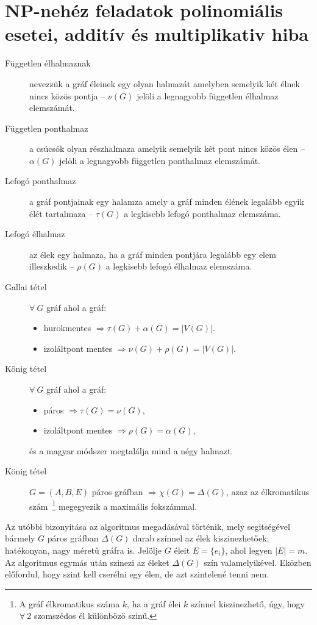\section{NP-nehéz feladatok polinomiális esetei, additív és multiplikativ hiba}

\begin{description}
  \item[Független élhalmaznak] nevezzük a gráf éleinek egy olyan halmazát
  amelyben semelyik két élnek nincs közös pontja -- $\nu(G)$ jelöli a legnagyobb
  független élhalmaz elemszámát.
  \item[Független ponthalmaz]  a csúcsók olyan részhalmaza amelyik semelyik két
  pont nincs közös élen -- $\alpha(G)$ jelöli a legnagyobb független ponthalmaz
  elemszámát.
  \item[Lefogó ponthalmaz] a gráf pontjainak egy halamza amely a gráf minden
  élének legalább egyik élét tartalmaza -- $\tau(G)$ a legkisebb lefogó
  ponthalmaz elemszáma.
  \item[Lefogó élhalmaz] az élek egy halmaza, ha a gráf minden pontjára legalább
  egy elem illeszkedik -- $\rho(G)$ a legkisebb lefogó élhalmaz elemszáma.
  \item[Gallai tétel] $\forall~G$ gráf ahol a gráf: \begin{itemize}
  		\item hurokmentes $\Rightarrow \tau(G)+\alpha(G) = |V(G)|$. 
  		\item izoláltpont mentes $\Rightarrow \nu(G) +\rho(G) = |V(G)|$.
   \end{itemize} 
   \item[König tétel] $\forall~G$ gráf ahol a gráf: \begin{itemize}
     \item páros $\Rightarrow \tau(G)=\nu(G)$,
     \item izoláltpont mentes $\Rightarrow \rho(G) = \alpha(G)$,
   \end{itemize}
   és a magyar módszer megtalálja mind a négy halmazt.
   \item[König tétel] $G=(A,B,E)$ páros gráfban $\Rightarrow \chi(G) =
   \Delta(G)$, azaz az élkromatikus szám~\footnote{A gráf élkromatikus száma
   $k$, ha a gráf élei $k$  színnel kiszinezhető, úgy, hogy $\forall~2$
   szomszédos él különböző szinű. } megegyezik a maximális fokszámmal.
\end{description}

Az utóbbi bizonyitása az algoritmus megadásával történik, mely segitségével
bármely $G$ páros gráfban $\Delta(G)$ darab színnel az élek kiszinezhetőek;
hatékonyan, nagy méretű gráfra is. Jelölje $G$ éleit $E=\{ e_i \}$, ahol legyen
$|E|=m$. Az algoritmus egymás után szinezi az éleket $\Delta(G)$ szín valamelyikével.
Eközben előfordul, hogy szint kell cserélni egy élen, de azt szintelené tenni nem.

